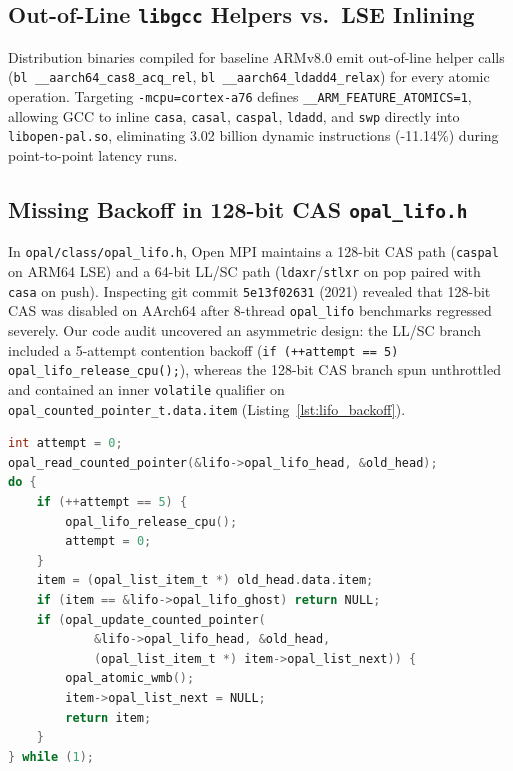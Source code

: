 \documentclass[conference]{IEEEtran}
\begin{document}
\subsection{Out-of-Line \texttt{libgcc} Helpers vs.\ LSE Inlining}
Distribution binaries compiled for baseline ARMv8.0 emit out-of-line helper calls (\texttt{bl \_\_aarch64\_cas8\_acq\_rel}, \texttt{bl \_\_aarch64\_ldadd4\_relax}) for every atomic operation. Targeting \texttt{-mcpu=cortex-a76} defines \texttt{\_\_ARM\_FEATURE\_ATOMICS=1}, allowing GCC to inline \texttt{casa}, \texttt{casal}, \texttt{caspal}, \texttt{ldadd}, and \texttt{swp} directly into \texttt{libopen-pal.so}, eliminating 3.02 billion dynamic instructions (-11.14\%) during point-to-point latency runs.

\subsection{Missing Backoff in 128-bit CAS \texttt{opal\_lifo.h}}
In \texttt{opal/class/opal\_lifo.h}, Open MPI maintains a 128-bit CAS path (\texttt{caspal} on ARM64 LSE) and a 64-bit LL/SC path (\texttt{ldaxr}/\texttt{stlxr} on pop paired with \texttt{casa} on push). Inspecting git commit \texttt{5e13f02631} (2021) revealed that 128-bit CAS was disabled on AArch64 after 8-thread \texttt{opal\_lifo} benchmarks regressed severely. Our code audit uncovered an asymmetric design: the LL/SC branch included a 5-attempt contention backoff (\texttt{if (++attempt == 5) opal\_lifo\_release\_cpu();}), whereas the 128-bit CAS branch spun unthrottled and contained an inner \texttt{volatile} qualifier on \texttt{opal\_counted\_pointer\_t.data.item} (Listing~\ref{lst:lifo_backoff}).

\begin{lstlisting}[language=C,caption={Symmetric 5-attempt contention backoff added to the 128-bit CAS \texttt{opal\_lifo\_pop\_atomic} path in \texttt{opal\_lifo.h}.},label={lst:lifo_backoff}]
int attempt = 0;
opal_read_counted_pointer(&lifo->opal_lifo_head, &old_head);
do {
    if (++attempt == 5) {
        opal_lifo_release_cpu();
        attempt = 0;
    }
    item = (opal_list_item_t *) old_head.data.item;
    if (item == &lifo->opal_lifo_ghost) return NULL;
    if (opal_update_counted_pointer(
            &lifo->opal_lifo_head, &old_head,
            (opal_list_item_t *) item->opal_list_next)) {
        opal_atomic_wmb();
        item->opal_list_next = NULL;
        return item;
    }
} while (1);
\end{lstlisting}
\end{document}
